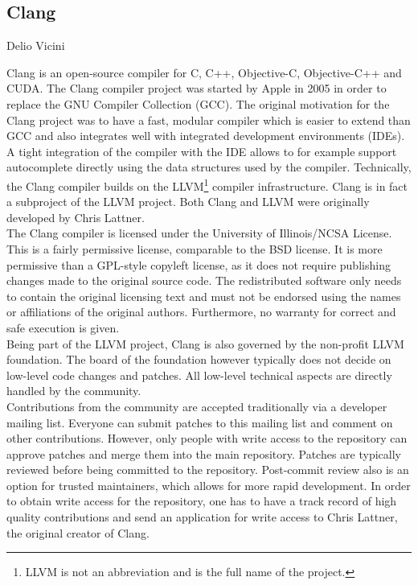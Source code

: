 \subsection{Clang}{Delio Vicini}

Clang is an open-source compiler for C, C++, Objective-C, Objective-C++ and CUDA. The Clang compiler project was started by Apple in 2005 in order to replace the GNU Compiler Collection (GCC). The original motivation for the Clang project was to have a fast, modular compiler which is easier to extend than GCC and also integrates well with integrated development environments (IDEs).\cite{clang-motivation} A tight integration of the compiler with the IDE allows to for example support autocomplete directly using the data structures used by the compiler. Technically, the Clang compiler builds on the LLVM\footnote{LLVM is not an abbreviation and is the full name of the project.} compiler infrastructure. Clang is in fact a subproject of the LLVM project. Both Clang and LLVM were originally developed by Chris Lattner.\cite{lattner} \\

The Clang compiler is licensed under the University of Illinois/NCSA License.\cite{clang-policy} This is a fairly permissive license, comparable to the BSD license. It is more permissive than a GPL-style copyleft license, as it does not require publishing changes made to the original source code. The redistributed software only needs to contain the original licensing text and must 
not be endorsed using the names or affiliations of the original authors. Furthermore, no warranty for correct and safe execution is given.\cite{illinois-license} \\

Being part of the LLVM project, Clang is also governed by the non-profit LLVM foundation.\cite{llvm-foundation} The board of the foundation however typically does not decide on low-level code changes and patches. All low-level technical aspects are directly handled by the community.\cite{clang-policy} \\

Contributions from the community are accepted traditionally via a developer mailing list. Everyone can submit patches to this mailing list and comment on other contributions. However, only people with write access to the repository can approve patches and merge them into the main repository. Patches are typically reviewed before being committed to the repository. Post-commit review also is an option for trusted maintainers, which allows for more rapid development. In order to obtain write access for the repository, one has to have a track record of high quality contributions and send an application for write access to Chris Lattner, the original creator of Clang. \\

